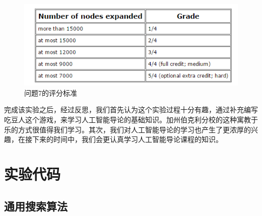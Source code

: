 \documentclass[forprint]{WHUBachelor}
\begin{document}
\begin{figure}[H]
  \centering
  \includegraphics[width=6in]{figures/problem7.png}
  \caption{问题7的评分标准}\label{fig:problem7}
\end{figure}

完成该实验之后，经过反思，我们首先认为这个实验过程十分有趣，通过补充编写吃豆人这个游戏，来学习人工智能导论的基础知识。加州伯克利分校\cite{berkeley}的这种寓教于乐的方式很值得我们学习。其次，我们对人工智能导论的学习也产生了更浓厚的兴趣，在接下来的时间中，我们会更认真学习人工智能导论课程的知识。

\cleardoublepage{}
{}
%




\appendix

\chapter{实验代码}

\section{通用搜索算法}
\end{document}
